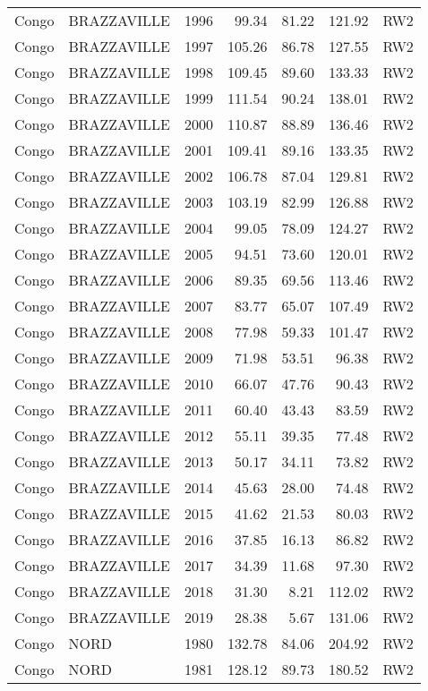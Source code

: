 \begin{longtable}{lllrrrl}
  Congo & BRAZZAVILLE & 1996 & 99.34 & 81.22 & 121.92 & RW2 \\ 
  Congo & BRAZZAVILLE & 1997 & 105.26 & 86.78 & 127.55 & RW2 \\ 
  Congo & BRAZZAVILLE & 1998 & 109.45 & 89.60 & 133.33 & RW2 \\ 
  Congo & BRAZZAVILLE & 1999 & 111.54 & 90.24 & 138.01 & RW2 \\ 
  Congo & BRAZZAVILLE & 2000 & 110.87 & 88.89 & 136.46 & RW2 \\ 
  Congo & BRAZZAVILLE & 2001 & 109.41 & 89.16 & 133.35 & RW2 \\ 
  Congo & BRAZZAVILLE & 2002 & 106.78 & 87.04 & 129.81 & RW2 \\ 
  Congo & BRAZZAVILLE & 2003 & 103.19 & 82.99 & 126.88 & RW2 \\ 
  Congo & BRAZZAVILLE & 2004 & 99.05 & 78.09 & 124.27 & RW2 \\ 
  Congo & BRAZZAVILLE & 2005 & 94.51 & 73.60 & 120.01 & RW2 \\ 
  Congo & BRAZZAVILLE & 2006 & 89.35 & 69.56 & 113.46 & RW2 \\ 
  Congo & BRAZZAVILLE & 2007 & 83.77 & 65.07 & 107.49 & RW2 \\ 
  Congo & BRAZZAVILLE & 2008 & 77.98 & 59.33 & 101.47 & RW2 \\ 
  Congo & BRAZZAVILLE & 2009 & 71.98 & 53.51 & 96.38 & RW2 \\ 
  Congo & BRAZZAVILLE & 2010 & 66.07 & 47.76 & 90.43 & RW2 \\ 
  Congo & BRAZZAVILLE & 2011 & 60.40 & 43.43 & 83.59 & RW2 \\ 
  Congo & BRAZZAVILLE & 2012 & 55.11 & 39.35 & 77.48 & RW2 \\ 
  Congo & BRAZZAVILLE & 2013 & 50.17 & 34.11 & 73.82 & RW2 \\ 
  Congo & BRAZZAVILLE & 2014 & 45.63 & 28.00 & 74.48 & RW2 \\ 
  Congo & BRAZZAVILLE & 2015 & 41.62 & 21.53 & 80.03 & RW2 \\ 
  Congo & BRAZZAVILLE & 2016 & 37.85 & 16.13 & 86.82 & RW2 \\ 
  Congo & BRAZZAVILLE & 2017 & 34.39 & 11.68 & 97.30 & RW2 \\ 
  Congo & BRAZZAVILLE & 2018 & 31.30 & 8.21 & 112.02 & RW2 \\ 
  Congo & BRAZZAVILLE & 2019 & 28.38 & 5.67 & 131.06 & RW2 \\ 
  Congo & NORD & 1980 & 132.78 & 84.06 & 204.92 & RW2 \\ 
  Congo & NORD & 1981 & 128.12 & 89.73 & 180.52 & RW2 \\ 

\end{longtable}
